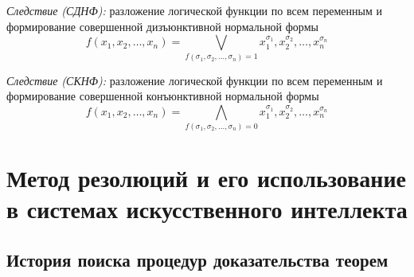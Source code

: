 \documentclass[a4paper,12pt]{report}
\begin{document}
	\textit{Следствие (СДНФ):} разложение
	логической функции по всем переменным и формирование совершенной
	дизъюнктивной нормальной формы
	$$ f(x_1, x_2, \dots, x_n) = \bigvee_{f(\sigma_1, \sigma_2, \dots, \sigma_n)
	= 1} x^{\sigma_1}_1, x^{\sigma_2}_2, \dots, x^{\sigma_n}_n $$

	\textit{Следствие (СКНФ):} разложение
	логической функции по всем переменным и формирование совершенной
	конъюнктивной нормальной формы
	$$ f(x_1, x_2, \dots, x_n) = \bigwedge_{f(\sigma_1, \sigma_2, \dots, \sigma_n)
	= 0} x^{\sigma_1}_1, x^{\sigma_2}_2, \dots, x^{\sigma_n}_n $$



\section{Метод резолюций и его использование в системах искусственного
	интеллекта}


\subsection{История поиска процедур доказательства теорем}
\end{document}
